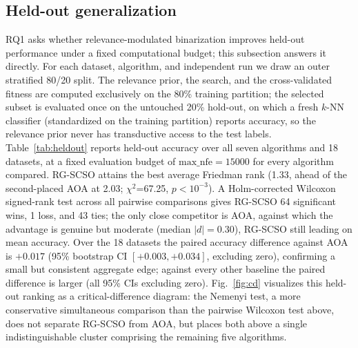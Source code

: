 \documentclass[iicol,sn-basic,pdflatex]{sn-jnl}
\begin{document}
\subsection{Held-out generalization}
\label{sec:heldout}
RQ1 asks whether relevance-modulated binarization improves held-out
performance under a fixed computational budget; this subsection answers it
directly. For each dataset, algorithm, and independent run we draw an outer
stratified 80/20 split. The relevance prior, the search, and the
cross-validated fitness are computed exclusively on the 80\% training
partition; the selected subset is evaluated once on the untouched 20\%
hold-out, on which a fresh $k$-NN classifier (standardized on the training
partition) reports accuracy, so the relevance prior never has transductive
access to the test labels. Table~\ref{tab:heldout} reports held-out
accuracy over all seven algorithms and 18 datasets, at a fixed
evaluation budget of $\mathrm{max\_nfe}=15000$ for every algorithm compared.
RG-SCSO attains the best average Friedman rank (1.33, ahead of
the second-placed AOA at 2.03; $\chi^2$=67.25,
$p<10^{-3}$). A
Holm-corrected Wilcoxon signed-rank test across all pairwise comparisons gives
RG-SCSO 64 significant wins, 1 loss, and 43 ties; the only close
competitor is AOA, against which the advantage is genuine but moderate
(median $|d|=0.30$), RG-SCSO still leading on mean accuracy. Over the
18 datasets the paired accuracy difference against AOA is $+0.017$ (95\%
bootstrap CI $[+0.003,+0.034]$, excluding zero), confirming a small but
consistent aggregate edge; against every other baseline the paired difference
is larger (all 95\% CIs excluding zero).
Fig.~\ref{fig:cd} visualizes this held-out ranking as a critical-difference
diagram: the Nemenyi test, a more conservative simultaneous comparison than
the pairwise Wilcoxon test above, does not separate RG-SCSO from AOA, but
places both above a single indistinguishable cluster comprising the
remaining five algorithms.
\end{document}
